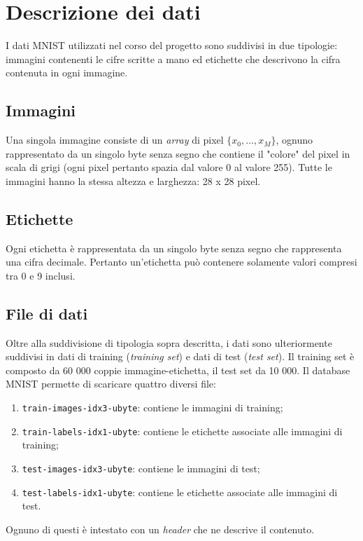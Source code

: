 
\section{Descrizione dei dati} \label{sec:data}
I dati MNIST utilizzati nel corso del progetto sono suddivisi in due tipologie: immagini contenenti le cifre scritte a mano ed etichette che descrivono la cifra contenuta in ogni immagine.

\subsection{Immagini}
Una singola immagine consiste di un {\it array} di pixel \(\{x_0, \dotsc, x_M\}\), ognuno rappresentato da un singolo byte senza segno che contiene il "colore" del pixel in scala di grigi (ogni pixel pertanto spazia dal valore 0 al valore 255). Tutte le immagini hanno la stessa altezza e larghezza: 28 x 28 pixel.

\subsection{Etichette}
Ogni etichetta \`e rappresentata da un singolo byte senza segno che rappresenta una cifra decimale. Pertanto un'etichetta pu\`o contenere solamente valori compresi tra 0 e 9 inclusi.

\subsection{File di dati}
 Oltre alla suddivisione di tipologia sopra descritta, i dati sono ulteriormente suddivisi in dati di training ({\it training set}) e dati di test ({\it test set}). Il training set \`e composto da 60 000 coppie immagine-etichetta, il test set da 10 000.
 Il database MNIST permette di scaricare quattro diversi file:
\begin{enumerate}
	\item {\tt train-images-idx3-ubyte}: contiene le immagini di training;
	\item {\tt train-labels-idx1-ubyte}: contiene le etichette associate alle immagini di training;
	\item {\tt test-images-idx3-ubyte}: contiene le immagini di test;
	\item {\tt test-labels-idx1-ubyte}: contiene le etichette associate alle immagini di test.
\end{enumerate}
Ognuno di questi \`e intestato con un {\it header} che ne descrive il contenuto.
